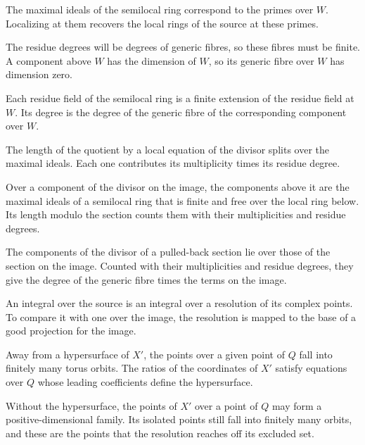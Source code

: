 The maximal ideals of the semilocal ring correspond to the primes over $W$. Localizing at them recovers the local rings
of the source at these primes.

The residue degrees will be degrees of generic fibres, so these fibres must be finite. A component above $W$ has the
dimension of $W$, so its generic fibre over $W$ has dimension zero.

Each residue field of the semilocal ring is a finite extension of the residue field at $W$. Its degree is the degree of
the generic fibre of the corresponding component over $W$.

The length of the quotient by a local equation of the divisor splits over the maximal ideals. Each one contributes its
multiplicity times its residue degree.

Over a component of the divisor on the image, the components above it are the maximal ideals of a semilocal ring that
is finite and free over the local ring below. Its length modulo the section counts them with their multiplicities and
residue degrees.

The components of the divisor of a pulled-back section lie over those of the section on the image. Counted with their
multiplicities and residue degrees, they give the degree of the generic fibre times the terms on the image.

An integral over the source is an integral over a resolution of its complex points. To compare it with one over the
image, the resolution is mapped to the base of a good projection for the image.

Away from a hypersurface of $X'$, the points over a given point of $Q$ fall into finitely many torus orbits. The ratios of
the coordinates of $X'$ satisfy equations over $Q$ whose leading coefficients define the hypersurface.

Without the hypersurface, the points of $X'$ over a point of $Q$ may form a positive-dimensional family. Its isolated
points still fall into finitely many orbits, and these are the points that the resolution reaches off its excluded set.


